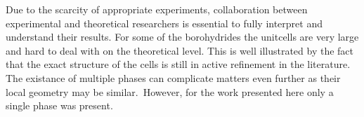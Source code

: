 Due to the scarcity of appropriate experiments, collaboration between experimental and theoretical researchers is essential to fully interpret and understand their results.
For some of the borohydrides the unitcells are very large and hard to deal with on the theoretical level.
This is well illustrated by the fact that the exact structure of the cells is still in active refinement in the literature.~\cite{cabh42-structure-p42m, cabh42-structure-p4}
The existance of multiple phases can complicate matters even further as their local geometry may be similar.~
However, for the work presented here only a single phase was present.



